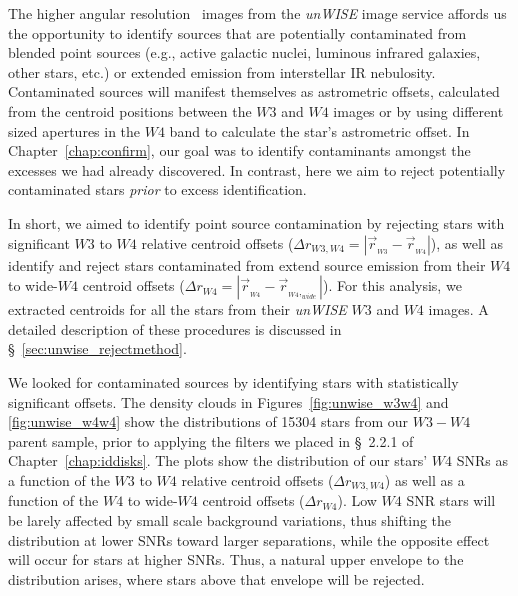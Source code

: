     The higher angular resolution \WS\ images from the \textit{unWISE} image service \citet{Lang2014} affords us the opportunity to identify sources that are potentially contaminated from blended point sources (e.g., active galactic nuclei, luminous infrared galaxies, other stars, etc.) or extended emission from interstellar IR nebulosity. Contaminated sources will manifest themselves as astrometric offsets, calculated from the centroid positions between the $W3$ and $W4$ images or by using different sized apertures in the $W4$ band to calculate the star's astrometric offset. In Chapter~\ref{chap:confirm}, our goal was to identify contaminants amongst the excesses we had already discovered. In contrast, here we aim to reject potentially contaminated stars \textit{prior} to excess identification.
    
    In short, we aimed to identify point source contamination by rejecting stars with significant $W3$ to $W4$ relative centroid offsets ($\Delta r_{W3,W4} = \left|\vec{r}_{_{W3}} - \vec{r}_{_{W4}}\right|$), as well as identify and reject stars contaminated from extend source emission from their $W4$ to wide-$W4$ centroid offsets ($\Delta r_{W4} = \left|\vec{r}_{_{W4}} - \vec{r}_{_{W4},_{wide}}\right|$). For this analysis, we extracted centroids for all the stars from their \textit{unWISE} $W3$ and $W4$ images. A detailed description of these procedures is discussed in \S~\ref{sec:unwise_rejectmethod}. 
    
    We looked for contaminated sources by identifying stars with statistically significant offsets. The density clouds in Figures~\ref{fig:unwise_w3w4} and \ref{fig:unwise_w4w4} show the distributions of 15304 stars from our $W3-W4$ parent sample, prior to applying the filters we placed in \S~2.2.1 of Chapter~\ref{chap:iddisks}. The plots show the distribution of our stars' $W4$ SNRs as a function of the $W3$ to $W4$ relative centroid offsets ($\Delta r_{W3,W4}$) as well as a function of the $W4$ to wide-$W4$ centroid offsets ($\Delta r_{W4}$). Low $W4$ SNR stars will be larely affected by small scale background variations, thus shifting the distribution at lower SNRs toward larger separations, while the opposite effect will occur for stars at higher SNRs. Thus, a natural upper envelope to the distribution arises, where stars above that envelope will be rejected. 
    

